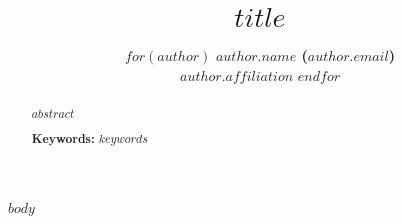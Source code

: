 \documentclass[10pt,letterpaper]{article}
\title{$title$}
\author{$for(author)$
  {\large \bf $author.name$ ($author.email$)} \\
  $author.affiliation$ \AND 
  $endfor$}
\begin{document}
\maketitle


\begin{abstract}
$abstract$

\textbf{Keywords:} 
$keywords$
\end{abstract}


$body$



\setlength{\bibleftmargin}{.125in}
\setlength{\bibindent}{-\bibleftmargin}


\end{document}
